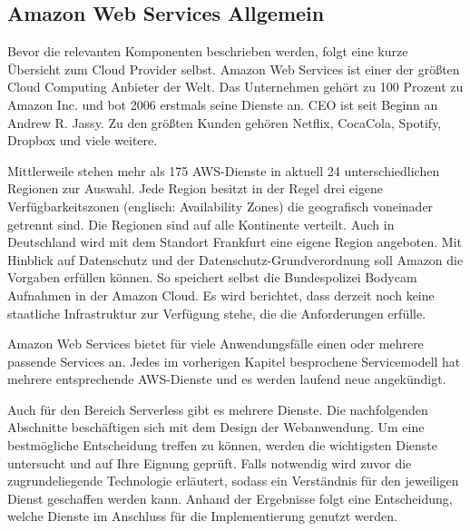 \subsection{Amazon Web Services Allgemein}

Bevor die relevanten Komponenten beschrieben werden, folgt eine kurze Übersicht zum Cloud Provider selbst.
Amazon Web Services ist einer der größten Cloud Computing Anbieter der Welt. Das Unternehmen gehört zu 100 Prozent zu Amazon Inc. und bot 2006 erstmals seine Dienste an. CEO ist seit Beginn an Andrew R. Jassy.
Zu den größten Kunden gehören Netflix, CocaCola, Spotify, Dropbox und viele weitere. \cite[]{AWSAllgemein}

Mittlerweile stehen mehr als 175 AWS-Dienste in aktuell 24 unterschiedlichen Regionen zur Auswahl.
Jede Region besitzt in der Regel drei eigene Verfügbarkeitszonen (englisch: Availability Zones) die geografisch voneinader getrennt sind.
Die Regionen sind auf alle Kontinente verteilt.
Auch in Deutschland wird mit dem Standort Frankfurt eine eigene Region angeboten.
Mit Hinblick auf Datenschutz und der Datenschutz-Grundverordnung soll Amazon die Vorgaben erfüllen können.
So speichert selbst die Bundespolizei Bodycam Aufnahmen in der Amazon Cloud.\cite[]{AWSPolizei}
Es wird berichtet, {}\glqq dass derzeit noch keine staatliche Infrastruktur zur Verfügung stehe, die die Anforderungen erfülle.\grqq{}
\cite[Abschnitt 1]{AWSPolizei}

Amazon Web Services bietet für viele Anwendungsfälle einen oder mehrere passende Services an.
Jedes im vorherigen Kapitel besprochene Servicemodell hat mehrere entsprechende AWS-Dienste und es werden laufend neue angekündigt.

Auch für den Bereich Serverless gibt es mehrere Dienste.
Die nachfolgenden Abschnitte beschäftigen sich mit dem Design der Webanwendung.
Um eine bestmögliche Entscheidung treffen zu können, werden die wichtigsten Dienste untersucht und auf Ihre Eignung geprüft.
Falls notwendig wird zuvor die zugrundeliegende Technologie erläutert, sodass ein Verständnis für den jeweiligen Dienst geschaffen werden kann.
Anhand der Ergebnisse folgt eine Entscheidung, welche Dienste im Anschluss für die Implementierung genutzt werden.




